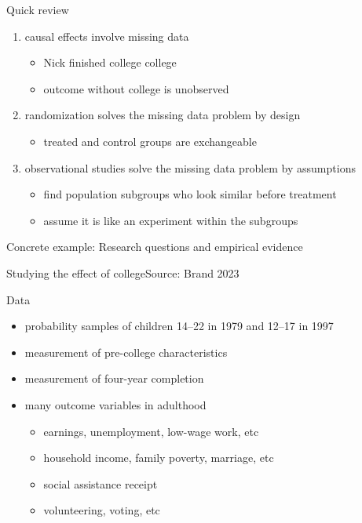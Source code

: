 \documentclass{beamer}
\begin{document}
\begin{frame}{Quick review} \pause

\begin{enumerate}
\item causal effects involve missing data
\begin{itemize}
\item Nick finished college college
\item outcome without college is unobserved
\end{itemize} \pause
\item randomization solves the missing data problem by design
\begin{itemize}
\item treated and control groups are exchangeable
\end{itemize} \pause
\item observational studies solve the missing data problem by assumptions
\begin{itemize}
\item find population subgroups who look similar before treatment
\item assume it is like an experiment within the subgroups
\end{itemize}
\end{enumerate} %

\end{frame}

\begin{frame}

Concrete example: Research questions and empirical evidence

\end{frame}

\begin{frame}{Studying the effect of college}{Source: Brand 2023}

Data
\begin{itemize}
\item probability samples of children 14--22 in 1979 and 12--17 in 1997
\item measurement of pre-college characteristics
\item measurement of four-year completion
\item many outcome variables in adulthood
\begin{itemize}
\item earnings, unemployment, low-wage work, etc
\item household income, family poverty, marriage, etc
\item social assistance receipt
\item volunteering, voting, etc
\end{itemize}
\end{itemize}

\end{frame}
\end{document}
